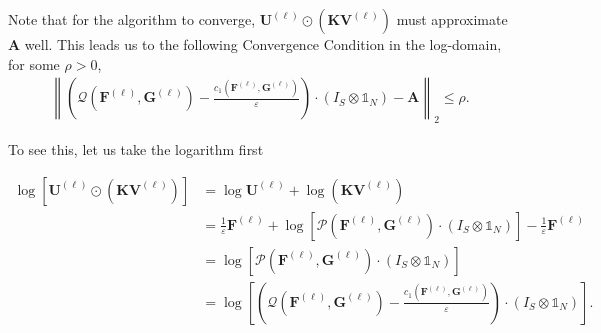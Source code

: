 \begin{remark}
  Note that for the algorithm to converge,
  $\mathbf{U}^{(\ell)} \odot \left(\mathbf{K} \mathbf{V}^{(\ell)}\right)$ must approximate $\mathbf{A}$ well.
  This leads us to the following Convergence Condition in the log-domain, for some $\rho > 0$,
  \begin{equation*}
    \begin{aligned}
      \left\lVert
      \left(
      \mathcal{Q} \left(\mathbf{F}^{(\ell)}, \mathbf{G}^{(\ell)}\right)
      - \frac{c_1 \left(\mathbf{F}^(\ell), \mathbf{G}^{(\ell)}\right)}{\varepsilon}
      \right)
      \cdot
      \left(I_S \otimes \mathbb{1}_N\right)
      - \mathbf{A}
      \right\rVert_2 \le \rho.
    \end{aligned}
  \end{equation*}

  To see this, let us take the logarithm first

  \begin{equation*}
    \begin{aligned}
      \log \left[\mathbf{U}^{(\ell)} \odot \left(\mathbf{K} \mathbf{V}^{(\ell)}\right)\right]
       & = \log \mathbf{U}^{(\ell)} + \log \left(\mathbf{K} \mathbf{V}^{(\ell)}\right) \\
       & = \frac1\varepsilon \mathbf{F}^{(\ell)}
      + \log \left[
        \mathcal{P} \left(\mathbf{F}^{(\ell)}, \mathbf{G}^{(\ell)}\right)\cdot
        \left(I_S \otimes \mathbb{1}_N\right)
        \right]
      - \frac1\varepsilon \mathbf{F}^{(\ell)}                                          \\
       & = \log \left[
        \mathcal{P} \left(\mathbf{F}^{(\ell)}, \mathbf{G}^{(\ell)}\right)\cdot
        \left(I_S \otimes \mathbb{1}_N\right)
      \right]                                                                          \\
       & =
      \log \left[
        \left(
        \mathcal{Q} \left(\mathbf{F}^{(\ell)}, \mathbf{G}^{(\ell)}\right)
        - \frac{c_1 \left(\mathbf{F}^(\ell), \mathbf{G}^{(\ell)}\right)}{\varepsilon}
        \right)
        \cdot
        \left(I_S \otimes \mathbb{1}_N\right)
        \right].
    \end{aligned}
  \end{equation*}
\end{remark}
